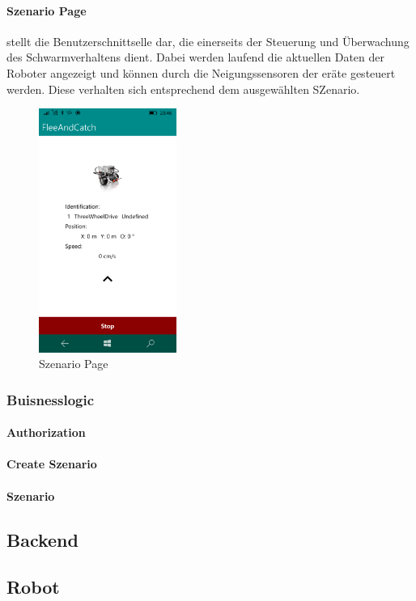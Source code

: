 \newpage
\paragraph{Szenario Page} stellt die Benutzerschnittselle dar, die einerseits der Steuerung und Überwachung des Schwarmverhaltens dient. Dabei werden laufend die aktuellen Daten der Roboter angezeigt und können durch die Neigungssensoren der eräte gesteuert werden. Diese verhalten sich entsprechend dem ausgewählten SZenario.

\begin{figure}[h]
	\begin{center}
		\includegraphics[width=0.4\textwidth]{images/implementation/szenario.png}
	\end{center}	
	\caption{Szenario Page}
	\label{fig:szenario}
\end{figure}

\newpage
\subsubsection{Buisnesslogic} %

\paragraph{Authorization}

\paragraph{Create Szenario}

\paragraph{Szenario}

\newpage
\subsection{Backend}

\subsection{Robot}

